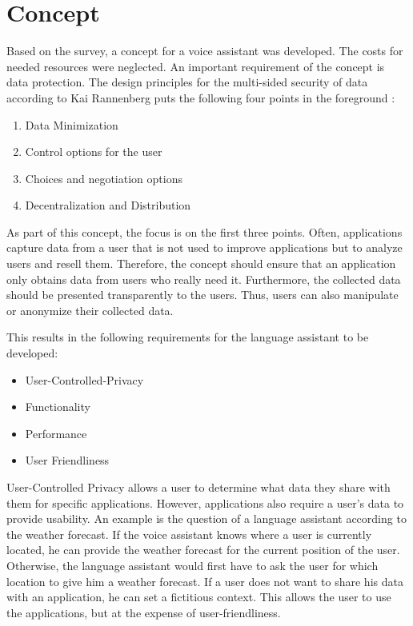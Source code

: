 \section{Concept}\label{sec:konzept}
Based on the survey, a concept for a voice assistant was developed. The costs for needed resources were neglected. An important requirement of the concept is data protection. The design principles for the multi-sided security of data according to Kai Rannenberg puts the following four points in the foreground \cite{kairannenberg}:

\begin{enumerate}
	\item Data Minimization
	\item Control options for the user 
	\item Choices and negotiation options 
	\item Decentralization and Distribution
\end{enumerate} 

As part of this concept, the focus is on the first three points. Often, applications capture data from a user that is not used to improve applications but to analyze users and resell them. Therefore, the concept should ensure that an application only obtains data from users who really need it. Furthermore, the collected data should be presented transparently to the users. Thus, users can also manipulate or anonymize their collected data.

This results in the following requirements for the language assistant to be developed:
\begin{itemize}
	\item User-Controlled-Privacy
	\item Functionality
	\item Performance
	\item User Friendliness	
\end{itemize}

User-Controlled Privacy allows a user to determine what data they share with them for specific applications. However, applications also require a user's data to provide usability. An example is the question of a language assistant according to the weather forecast. If the voice assistant knows where a user is currently located, he can provide the weather forecast for the current position of the user. Otherwise, the language assistant would first have to ask the user for which location to give him a weather forecast. If a user does not want to share his data with an application, he can set a fictitious context. This allows the user to use the applications, but at the expense of user-friendliness.


